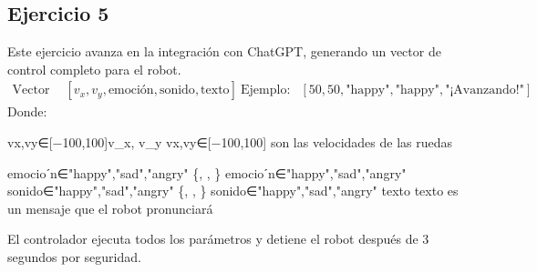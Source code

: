 \documentclass{article}
\begin{document}
\subsection*{Ejercicio 5}

Este ejercicio avanza en la integración con ChatGPT, generando un vector de control completo para el robot.
$$\begin{aligned}
	\text{Vector de control:} &[v_x, v_y, \text{emoción}, \text{sonido}, \text{texto}] \
	\text{Ejemplo:} &[50, 50, \text{"happy"}, \text{"happy"}, \text{"¡Avanzando!"}]
\end{aligned}$$
Donde:

vx,vy∈[−100,100]v_x, v_y \in [-100, 100]
vx​,vy​∈[−100,100] son las velocidades de las ruedas

emocioˊn∈{"happy","sad","angry"} \in \{, , \}
emocioˊn∈{"happy","sad","angry"}
sonido∈{"happy","sad","angry"} \in \{, , \}
sonido∈{"happy","sad","angry"}
texto
texto es un mensaje que el robot pronunciará


El controlador ejecuta todos los parámetros y detiene el robot después de 3 segundos por seguridad.
\end{document}
